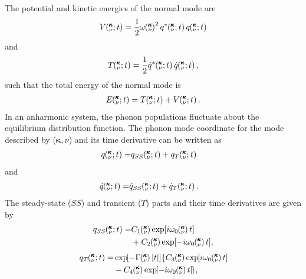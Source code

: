 The potential and kinetic energies of the normal mode are
\begin{equation}\label{A:E:q_U}
\begin{split}
V\kvt = \frac{1}{2} \omega \kv^2 q^*\kvt q\kvt
\end{split}
\end{equation}
and
\begin{equation}\label{A:E:q_T}
\begin{split}
T\kvt = \frac{1}{2} \dot{q}^*\kvt \dot{q}\kvt, 
\end{split}
\end{equation}
such that the total energy of the normal mode is
\begin{equation}\label{A:E:q_E}
\begin{split}
E\kvt = T\kvt + V\kvt.
\end{split}
\end{equation}
In an anharmonic system, the phonon populations fluctuate about the
equilibrium distribution function.\cite{wallace_thermodynamics_1972,
maradudin_dynamical_1974,srivastava_physics_1990} 
The phonon mode 
coordinate for the mode described by ($\pmb{\kappa},\nu$) and its time
derivative can be written as
\begin{equation}\label{A:E:q_A}
\begin{split}
q\kvt=&q_{SS}\kvt+q_{T}\kvt
\end{split}
\end{equation}
and
\begin{equation}\label{A:E:qdot_A}
\begin{split}
\dot{q}\kvt=& \dot{q}_{SS}\kvt+\dot{q}_{T}\kvt.
\end{split}
\end{equation}
The steady-state ($SS$) and transient ($T$) parts and their time 
derivatives are given by
\begin{equation}\label{A:E:q_A_SS}
\begin{split}
q_{SS}\kvt=& C_1\kv\exp[i\omega_0\kv t]
\\& +C_2\kv\exp[-i\omega_0\kv t],
\end{split}
\end{equation}
\begin{equation}\label{A:E:q_A_T}
\begin{split}
q_{T}\kvt=& \EXP{-\Gamma\kv |t|}\lbrace C_3\kv\EXP{i\omega_0\kv t}
\\ &-C_4\kv\EXP{-i\omega_0\kv t } \rbrace,
\end{split}
\end{equation}
